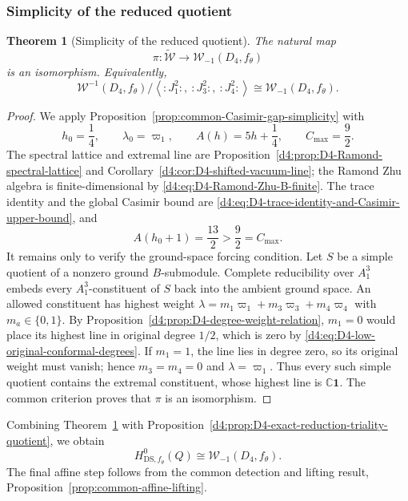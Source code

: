 \documentclass[11pt,reqno]{amsart}
\newtheorem{theorem}{Theorem}[section]
\theoremstyle{definition}
\theoremstyle{remark}
\begin{document}
\subsubsection{Simplicity of the reduced quotient}


\begin{theorem}[Simplicity of the reduced quotient]
\label{d4:thm:D4-reduced-quotient-simple}
The natural map
\begin{equation*}
  \pi:\widetilde{\mathcal W}
  \longrightarrow
  \mathcal W_{-1}(D_4,f_\theta)
\end{equation*}
is an isomorphism.  Equivalently,
\begin{equation*}
  \mathcal W^{-1}(D_4,f_\theta)
  \Big/
  \left\langle
    :J_1^2:,\ :J_3^2:,\ :J_4^2:
  \right\rangle
  \cong
  \mathcal W_{-1}(D_4,f_\theta).
\end{equation*}
\end{theorem}

\begin{proof}
We apply Proposition~\ref{prop:common-Casimir-gap-simplicity} with
\[
 h_0=\frac14,
 \qquad
 \lambda_0=\varpi_1,
 \qquad
 A(h)=5h+\frac14,
 \qquad
 C_{\max}=\frac92.
\]
The spectral lattice and extremal line are
Proposition~\ref{d4:prop:D4-Ramond-spectral-lattice} and
Corollary~\ref{d4:cor:D4-shifted-vacuum-line}; the Ramond Zhu algebra is
finite-dimensional by \eqref{d4:eq:D4-Ramond-Zhu-B-finite}.  The trace
identity and the global Casimir bound are
\eqref{d4:eq:D4-trace-identity-and-Casimir-upper-bound}, and
\[
 A(h_0+1)=\frac{13}{2}>\frac92=C_{\max}.
\]
It remains only to verify the ground-space forcing condition.  Let $S$ be
a simple quotient of a nonzero ground $B$-submodule.  Complete reducibility
over $A_1^3$ embeds every $A_1^3$-constituent of $S$ back into the ambient
ground space.  An allowed constituent has highest weight
$\lambda=m_1\varpi_1+m_3\varpi_3+m_4\varpi_4$ with
$m_a\in\{0,1\}$.  By
Proposition~\ref{d4:prop:D4-degree-weight-relation}, $m_1=0$ would place its
highest line in original degree $1/2$, which is zero by
\eqref{d4:eq:D4-low-original-conformal-degrees}.  If $m_1=1$, the line lies
in degree zero, so its original weight must vanish; hence
$m_3=m_4=0$ and $\lambda=\varpi_1$.  Thus every such simple quotient
contains the extremal constituent, whose highest line is
$\mathbb C\mathbf1$.  The common criterion proves that $\pi$ is an
isomorphism.
\end{proof}

Combining Theorem~\ref{d4:thm:D4-reduced-quotient-simple} with
Proposition~\ref{d4:prop:D4-exact-reduction-triality-quotient}, we obtain
\begin{equation*}
  H^0_{\mathrm{DS},f_\theta}(Q)
  \cong
  \mathcal W_{-1}(D_4,f_\theta).
\end{equation*}
The final affine step follows from the common detection and lifting result,
Proposition~\ref{prop:common-affine-lifting}.
\end{document}
